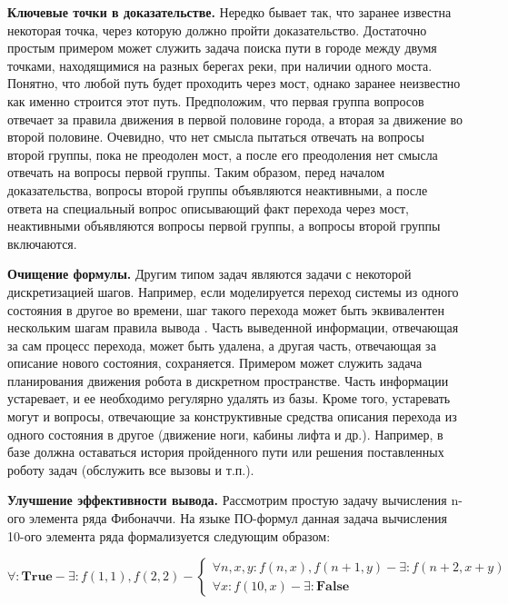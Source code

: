 \textbf{Ключевые точки в доказательстве.} Нередко бывает так, что заранее известна некоторая точка, через которую должно пройти доказательство. Достаточно простым примером может служить задача поиска пути в городе между двумя точками, находящимися на разных берегах реки, при наличии одного моста. Понятно, что любой путь будет проходить через мост, однако заранее неизвестно как именно строится этот путь. Предположим, что первая группа вопросов отвечает за правила движения в первой половине города, а вторая за движение во второй половине. Очевидно, что нет смысла пытаться отвечать на вопросы второй группы, пока не преодолен мост, а после его преодоления нет смысла отвечать на вопросы первой группы. Таким образом, перед началом доказательства, вопросы второй группы объявляются неактивными, а после ответа на специальный вопрос описывающий факт перехода через мост, неактивными объявляются вопросы первой группы, а вопросы второй группы включаются.

\textbf{Очищение формулы.} Другим типом задач являются задачи с некоторой дискретизацией шагов. Например, если моделируется переход системы из одного состояния в другое во времени, шаг такого перехода может быть эквивалентен нескольким шагам правила вывода . Часть выведенной информации, отвечающая за сам процесс перехода, может быть удалена, а другая часть, отвечающая за описание нового состояния, сохраняется. Примером может служить задача планирования движения робота в дискретном пространстве. Часть информации устаревает, и ее необходимо регулярно удалять из базы. Кроме того, устаревать могут и вопросы, отвечающие за конструктивные средства описания перехода из одного состояния в другое (движение ноги, кабины лифта и др.). Например, в базе должна оставаться история пройденного пути или решения поставленных роботу задач (обслужить все вызовы и т.п.).

\textbf{Улучшение эффективности вывода.} Рассмотрим простую задачу вычисления n-ого элемента ряда Фибоначчи. На языке ПО-формул данная задача вычисления 10-ого элемента ряда формализуется следующим образом:

\begin{equation}
	\forall\colon\boldsymbol{True} - \exists\colon f(1,1), f(2,2) -
	\left\lbrace
	\begin{array}{l}
		\forall n,x,y\colon f(n,x),f(n+1,y) - \exists\colon f(n+2,x+y) \\
		\forall x\colon f(10,x) - \exists\colon \boldsymbol{False}
	\end{array}\right.
\end{equation}

